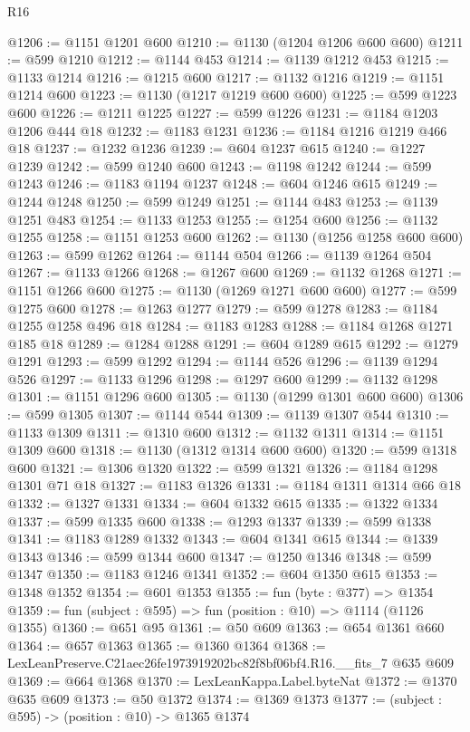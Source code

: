 \begin{lexlean}{R16}
\begin{coremodule}
@1206 := @1151 @1201 @600
@1210 := @1130 (@1204 @1206 @600 @600)
@1211 := @599 @1210
@1212 := @1144 @453
@1214 := @1139 @1212 @453
@1215 := @1133 @1214
@1216 := @1215 @600
@1217 := @1132 @1216
@1219 := @1151 @1214 @600
@1223 := @1130 (@1217 @1219 @600 @600)
@1225 := @599 @1223 @600
@1226 := @1211 @1225
@1227 := @599 @1226
@1231 := @1184 @1203 @1206 @444 @18
@1232 := @1183 @1231
@1236 := @1184 @1216 @1219 @466 @18
@1237 := @1232 @1236
@1239 := @604 @1237 @615
@1240 := @1227 @1239
@1242 := @599 @1240 @600
@1243 := @1198 @1242
@1244 := @599 @1243
@1246 := @1183 @1194 @1237
@1248 := @604 @1246 @615
@1249 := @1244 @1248
@1250 := @599 @1249
@1251 := @1144 @483
@1253 := @1139 @1251 @483
@1254 := @1133 @1253
@1255 := @1254 @600
@1256 := @1132 @1255
@1258 := @1151 @1253 @600
@1262 := @1130 (@1256 @1258 @600 @600)
@1263 := @599 @1262
@1264 := @1144 @504
@1266 := @1139 @1264 @504
@1267 := @1133 @1266
@1268 := @1267 @600
@1269 := @1132 @1268
@1271 := @1151 @1266 @600
@1275 := @1130 (@1269 @1271 @600 @600)
@1277 := @599 @1275 @600
@1278 := @1263 @1277
@1279 := @599 @1278
@1283 := @1184 @1255 @1258 @496 @18
@1284 := @1183 @1283
@1288 := @1184 @1268 @1271 @185 @18
@1289 := @1284 @1288
@1291 := @604 @1289 @615
@1292 := @1279 @1291
@1293 := @599 @1292
@1294 := @1144 @526
@1296 := @1139 @1294 @526
@1297 := @1133 @1296
@1298 := @1297 @600
@1299 := @1132 @1298
@1301 := @1151 @1296 @600
@1305 := @1130 (@1299 @1301 @600 @600)
@1306 := @599 @1305
@1307 := @1144 @544
@1309 := @1139 @1307 @544
@1310 := @1133 @1309
@1311 := @1310 @600
@1312 := @1132 @1311
@1314 := @1151 @1309 @600
@1318 := @1130 (@1312 @1314 @600 @600)
@1320 := @599 @1318 @600
@1321 := @1306 @1320
@1322 := @599 @1321
@1326 := @1184 @1298 @1301 @71 @18
@1327 := @1183 @1326
@1331 := @1184 @1311 @1314 @66 @18
@1332 := @1327 @1331
@1334 := @604 @1332 @615
@1335 := @1322 @1334
@1337 := @599 @1335 @600
@1338 := @1293 @1337
@1339 := @599 @1338
@1341 := @1183 @1289 @1332
@1343 := @604 @1341 @615
@1344 := @1339 @1343
@1346 := @599 @1344 @600
@1347 := @1250 @1346
@1348 := @599 @1347
@1350 := @1183 @1246 @1341
@1352 := @604 @1350 @615
@1353 := @1348 @1352
@1354 := @601 @1353
@1355 := fun (byte : @377) => @1354
@1359 := fun (subject : @595) => fun (position : @10) => @1114 (@1126 @1355)
@1360 := @651 @95
@1361 := @50 @609
@1363 := @654 @1361 @660
@1364 := @657 @1363
@1365 := @1360 @1364
@1368 := LexLeanPreserve.C21aec26fe1973919202bc82f8bf06bf4.R16.__fits_7 @635 @609
@1369 := @664 @1368
@1370 := LexLeanKappa.Label.byteNat
@1372 := @1370 @635 @609
@1373 := @50 @1372
@1374 := @1369 @1373
@1377 := (subject : @595) -> (position : @10) -> @1365 @1374

\end{coremodule}
\end{lexlean}
